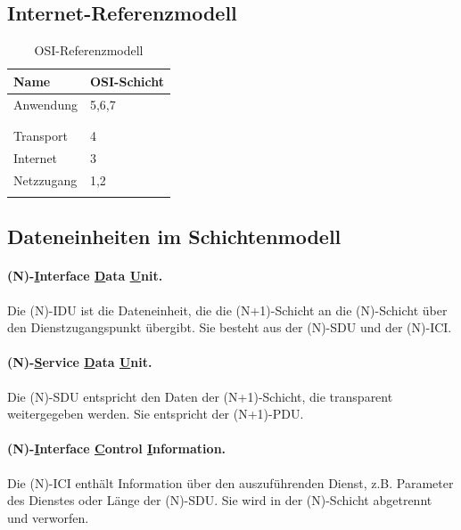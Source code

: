 \documentclass[]{scrartcl}
\begin{document}
\subsection{Internet-Referenzmodell}

\begin{table}[H]
\begin{center}
\begin{tabular}{ll}
 Name  & OSI-Schicht \\
\toprule
 Anwendung &  5,6,7\\
  \\
   \\
\midrule
Transport &  4\\
\midrule
Internet & 3 \\
\midrule
Netzzugang & 1,2 \\
 \\
\bottomrule
\end{tabular}
\caption{OSI-Referenzmodell}

\end{center}
\label{default}
\end{table}%

\subsection{Dateneinheiten im Schichtenmodell}


\paragraph{(N)-\underline{I}nterface \underline{D}ata \underline{U}nit.} Die (N)-IDU ist die Dateneinheit, die die (N+1)-Schicht an die (N)-Schicht \"uber den Dienstzugangspunkt \"ubergibt. Sie besteht aus der (N)-SDU und der (N)-ICI.

\paragraph{(N)-\underline{S}ervice \underline{D}ata \underline{U}nit.} Die (N)-SDU entspricht den Daten der (N+1)-Schicht, die transparent weitergegeben werden. Sie entspricht der (N+1)-PDU.

\paragraph{(N)-\underline{I}nterface \underline{C}ontrol \underline{I}nformation.} Die (N)-ICI enth\"alt Information \"uber den auszuf\"uhrenden Dienst, z.B. Parameter des Dienstes oder L\"ange der (N)-SDU. Sie wird in der (N)-Schicht abgetrennt und verworfen.
\end{document}
